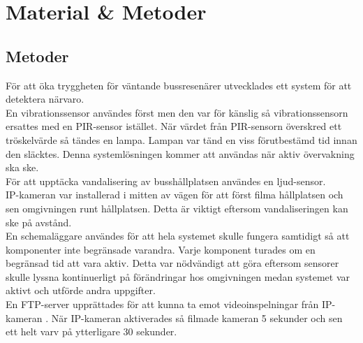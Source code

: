 



\chapter{Material \& Metoder} %
\label{ch:metoder}


\ifpdf
    \graphicspath{{8/figures/PNG/}{8_materials_and_methods/figures/PDF/}{8_materials_and_methods/figures/}}
\else
    \graphicspath{{8/figures/EPS/}{8_materials_and_methods/figures/}}
\fi




\section{Metoder}
För att öka tryggheten för väntande bussresenärer utvecklades ett system för att detektera närvaro.\\

En vibrationssensor användes först men den var för känslig så vibrationssensorn ersattes med en PIR-sensor istället. När värdet från PIR-sensorn överskred ett tröskelvärde så tändes en lampa. Lampan var tänd en viss förutbestämd tid innan den släcktes. Denna systemlösningen kommer att användas när aktiv övervakning ska ske.\\

För att upptäcka vandalisering av busshållplatsen användes en ljud-sensor. \\

IP-kameran var installerad i mitten av vägen för att först filma hållplatsen och sen omgivningen runt hållplatsen. Detta är viktigt eftersom vandaliseringen kan ske på avstånd.\\

En schemaläggare användes för att hela systemet skulle fungera samtidigt så att komponenter inte begränsade varandra. Varje komponent turades om en begränsad tid att vara aktiv. Detta var nödvändigt att göra eftersom sensorer skulle lyssna kontinuerligt på förändringar hos omgivningen medan systemet var aktivt och utförde andra uppgifter.\\

En FTP-server upprättades för att kunna ta emot videoinspelningar från IP-kameran . När IP-kameran aktiverades så filmade kameran 5 sekunder och sen ett helt varv på ytterligare 30 sekunder. \\

